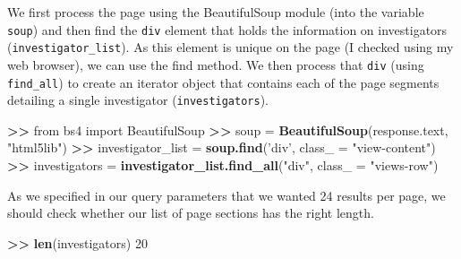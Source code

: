 \documentclass[]{krantz}
\newenvironment{Shaded}{\begin{snugshade}}{\end{snugshade}}
\newcommand{\KeywordTok}[1]{\textcolor[rgb]{0.13,0.29,0.53}{\textbf{#1}}}
\newcommand{\DataTypeTok}[1]{\textcolor[rgb]{0.13,0.29,0.53}{#1}}
\newcommand{\DecValTok}[1]{\textcolor[rgb]{0.00,0.00,0.81}{#1}}
\newcommand{\StringTok}[1]{\textcolor[rgb]{0.31,0.60,0.02}{#1}}
\newcommand{\OperatorTok}[1]{\textcolor[rgb]{0.81,0.36,0.00}{\textbf{#1}}}
\newcommand{\ErrorTok}[1]{\textcolor[rgb]{0.64,0.00,0.00}{\textbf{#1}}}
\newcommand{\NormalTok}[1]{#1}
\begin{document}
We first process the page using the BeautifulSoup module (into the
variable \texttt{soup}) and then find the \texttt{div} element that
holds the information on investigators (\texttt{investigator\_list}). As
this element is unique on the page (I checked using my web browser), we
can use the find method. We then process that \texttt{div} (using
\texttt{find\_all}) to create an iterator object that contains each of
the page segments detailing a single investigator
(\texttt{investigators}).

\begin{Shaded}
\begin{Highlighting}[]
\OperatorTok{>}\ErrorTok{>}\StringTok{ }\NormalTok{from bs4 import BeautifulSoup}
\OperatorTok{>}\ErrorTok{>}\StringTok{ }\NormalTok{soup =}\StringTok{ }\KeywordTok{BeautifulSoup}\NormalTok{(response.text, }\StringTok{"html5lib"}\NormalTok{)}
\OperatorTok{>}\ErrorTok{>}\StringTok{ }\NormalTok{investigator_list =}\StringTok{ }\KeywordTok{soup.find}\NormalTok{(}\StringTok{'div'}\NormalTok{, }\DataTypeTok{class_ =} \StringTok{"view-content"}\NormalTok{)}
\OperatorTok{>}\ErrorTok{>}\StringTok{ }\NormalTok{investigators =}\StringTok{ }\KeywordTok{investigator_list.find_all}\NormalTok{(}\StringTok{"div"}\NormalTok{, }\DataTypeTok{class_ =} \StringTok{"views-row"}\NormalTok{)}
\end{Highlighting}
\end{Shaded}

As we specified in our query parameters that we wanted 24 results per
page, we should check whether our list of page sections has the right
length.

\begin{Shaded}
\begin{Highlighting}[]
\OperatorTok{>}\ErrorTok{>}\StringTok{ }\KeywordTok{len}\NormalTok{(investigators)}
\DecValTok{20}
\end{Highlighting}
\end{Shaded}
\end{document}
